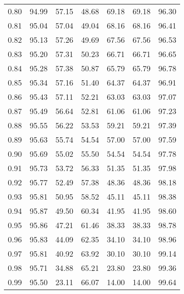 \begin{tabular}{|c|c|c|c|c|c|c|}
      0.80 &     94.99 &     57.15 &      48.68 &   69.18 &      69.18 &         96.30 \\
      0.81 &     95.04 &     57.04 &      49.04 &   68.16 &      68.16 &         96.41 \\
      0.82 &     95.13 &     57.26 &      49.69 &   67.56 &      67.56 &         96.53 \\
      0.83 &     95.20 &     57.31 &      50.23 &   66.71 &      66.71 &         96.65 \\
      0.84 &     95.28 &     57.38 &      50.87 &   65.79 &      65.79 &         96.78 \\
      0.85 &     95.34 &     57.16 &      51.40 &   64.37 &      64.37 &         96.91 \\
      0.86 &     95.43 &     57.11 &      52.21 &   63.03 &      63.03 &         97.07 \\
      0.87 &     95.49 &     56.64 &      52.81 &   61.06 &      61.06 &         97.23 \\
      0.88 &     95.55 &     56.22 &      53.53 &   59.21 &      59.21 &         97.39 \\
      0.89 &     95.63 &     55.74 &      54.54 &   57.00 &      57.00 &         97.59 \\
      0.90 &     95.69 &     55.02 &      55.50 &   54.54 &      54.54 &         97.78 \\
      0.91 &     95.73 &     53.72 &      56.33 &   51.35 &      51.35 &         97.98 \\
      0.92 &     95.77 &     52.49 &      57.38 &   48.36 &      48.36 &         98.18 \\
      0.93 &     95.81 &     50.95 &      58.52 &   45.11 &      45.11 &         98.38 \\
      0.94 &     95.87 &     49.50 &      60.34 &   41.95 &      41.95 &         98.60 \\
      0.95 &     95.86 &     47.21 &      61.46 &   38.33 &      38.33 &         98.78 \\
      0.96 &     95.83 &     44.09 &      62.35 &   34.10 &      34.10 &         98.96 \\
      0.97 &     95.81 &     40.92 &      63.92 &   30.10 &      30.10 &         99.14 \\
      0.98 &     95.71 &     34.88 &      65.21 &   23.80 &      23.80 &         99.36 \\
      0.99 &     95.50 &     23.11 &      66.07 &   14.00 &      14.00 &         99.64 \\
\bottomrule
\end{tabular}
